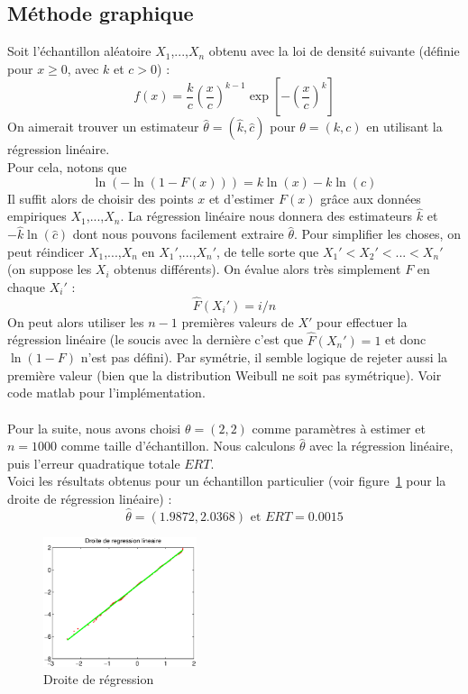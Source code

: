 \subsection{Méthode graphique}
Soit l'échantillon aléatoire $X_1$,...,$X_n$ obtenu avec la loi de densité suivante (définie pour $x \geq 0$, avec $k$ et $c > 0$) :
$$ f(x) = \frac{k}{c}\left(\frac{x}{c}\right)^{k-1}\exp\left[-\left(\frac{x}{c}\right)^{k}\right] $$ 
On aimerait trouver un estimateur $\hat{\theta} = (\hat{k},\hat{c})$ pour $\theta = (k,c)$ en utilisant la régression linéaire.\\
Pour cela, notons que
$$ \ln(-\ln(1-F(x))) = k\ln(x)-k\ln(c) $$
Il suffit alors de choisir des points $x$ et d'estimer $F(x)$ grâce aux données empiriques $X_1$,...,$X_n$. La régression linéaire nous donnera des estimateurs $\hat{k}$ et $-\hat{k}\ln(\hat{c})$ dont nous pouvons facilement extraire $\hat{\theta}$. Pour simplifier les choses, on peut réindicer $X_1$,...,$X_n$ en $X_1'$,...,$X_n'$, de telle sorte que $X_1'<X_2'<$...$<X_n'$ (on suppose les $X_i$ obtenus différents). On évalue alors très simplement $F$ en chaque $X_i'$ : 
$$ \hat{F}(X_i') = i/n $$
On peut alors utiliser les $n-1$ premières valeurs de $X'$ pour effectuer la régression linéaire (le soucis avec la dernière c'est que $\hat{F}(X_n') = 1$ et donc $\ln(1-F)$ n'est pas défini). Par symétrie, il semble logique de rejeter aussi la première valeur (bien que la distribution Weibull ne soit pas symétrique). Voir code matlab pour l'implémentation.
\paragraph{}
Pour la suite, nous avons choisi $\theta = (2,2)$ comme paramètres à estimer et $n =1000$ comme taille d'échantillon.
Nous calculons $\hat{\theta}$ avec la régression linéaire, puis l'erreur quadratique totale $ERT$.\\
Voici les résultats obtenus pour un échantillon particulier (voir figure~\ref{fig:droite} pour la droite de régression linéaire) :
$$ \hat{\theta} = (1.9872,2.0368) \text{ et } ERT  = 0.0015 $$

\begin{figure}[!ht]
        \centering
        \includegraphics[width=0.4\textwidth]{graphes/droite_mg.eps}
        \caption{Droite de régression}\label{fig:droite}
\end{figure}


